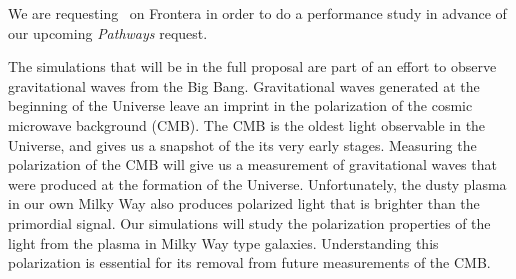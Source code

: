 
We are requesting \request\ on Frontera in order to do a performance study in
advance of our upcoming \emph{Pathways} request.  

The simulations that will be in the full proposal are part of an effort to
observe gravitational waves from the Big Bang.  Gravitational waves generated at
the beginning of the Universe leave an imprint in the polarization of the cosmic
microwave background (CMB).  The CMB is the oldest light observable in the
Universe, and gives us a snapshot of the its very early stages.
Measuring the polarization of the CMB will give us a measurement of
gravitational waves that were produced at the formation of the Universe.
Unfortunately, the dusty plasma in our own Milky Way also produces polarized
light that is brighter than the primordial signal.  Our simulations will study
the polarization properties of the light from the plasma in Milky Way type
galaxies.  Understanding this polarization is essential for its removal from
future measurements of the CMB.


